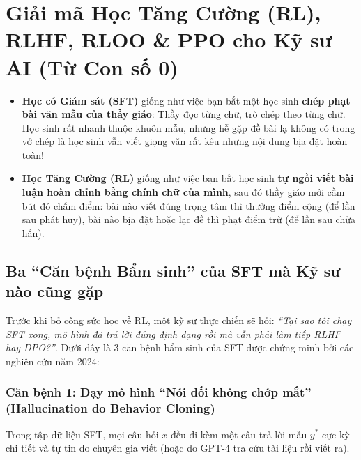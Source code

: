 \chapter{Giải mã Học Tăng Cường (RL), RLHF, RLOO \& PPO cho Kỹ sư AI (Từ Con số 0)}
\label{chap:rlhf_ppo_eng}
\label{ch:rl_ppo}

\begin{mentalmodel}
\begin{itemize}[leftmargin=1.2cm]
    \item \textbf{Học có Giám sát (SFT)} giống như việc bạn bắt một học sinh \textbf{chép phạt bài văn mẫu của thầy giáo}: Thầy đọc từng chữ, trò chép theo từng chữ. Học sinh rất nhanh thuộc khuôn mẫu, nhưng hễ gặp đề bài lạ không có trong vở chép là học sinh vẫn viết giọng văn rất kêu nhưng nội dung bịa đặt hoàn toàn!
    \item \textbf{Học Tăng Cường (RL)} giống như việc bạn bắt học sinh \textbf{tự ngồi viết bài luận hoàn chỉnh bằng chính chữ của mình}, sau đó thầy giáo mới cầm bút đỏ chấm điểm: bài nào viết đúng trọng tâm thì thưởng điểm cộng (để lần sau phát huy), bài nào bịa đặt hoặc lạc đề thì phạt điểm trừ (để lần sau chừa hẳn).
\end{itemize}
\end{mentalmodel}

\section{Ba ``Căn bệnh Bẩm sinh'' của SFT mà Kỹ sư nào cũng gặp}
\label{sec:three_sins_of_sft}

Trước khi bỏ công sức học về RL, một kỹ sư thực chiến sẽ hỏi: \textit{``Tại sao tôi chạy SFT xong, mô hình đã trả lời đúng định dạng rồi mà vẫn phải làm tiếp RLHF hay DPO?''}. Dưới đây là 3 căn bệnh bẩm sinh của SFT được chứng minh bởi các nghiên cứu năm 2024:

\subsection{Căn bệnh 1: Dạy mô hình ``Nói dối không chớp mắt'' (Hallucination do Behavior Cloning)}
Trong tập dữ liệu SFT, mọi câu hỏi $x$ đều đi kèm một câu trả lời mẫu $y^*$ cực kỳ chi tiết và tự tin do chuyên gia viết (hoặc do GPT-4 tra cứu tài liệu rồi viết ra).

